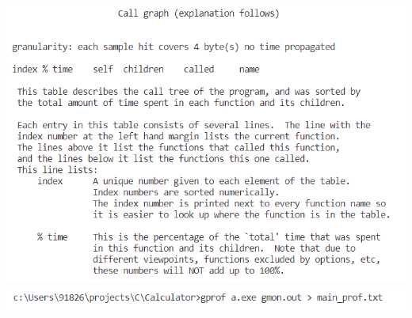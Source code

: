 \documentclass{article}
\begin{document}
\includegraphics[scale=0.70]{cpp_main_prof_05}\\
\includegraphics[scale=0.70]{cpp_main_prof_06}\\
\end{document}
